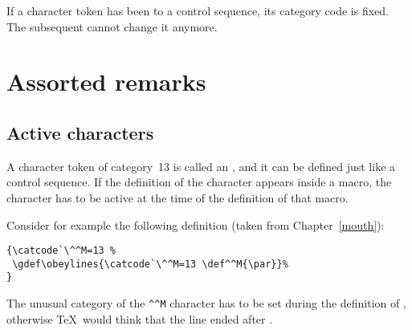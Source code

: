 \documentclass[letterpaper]{book}
\begin{document}
If a character token has been  to a control
sequence, its category code is fixed.
The subsequent  cannot change
it anymore.

\section{Assorted remarks}

\subsection{Active characters}

A character token of category~13 is called an
, and it
can be defined just like a control sequence.
If the definition of the character appears inside a macro,
the character has to be active at the time of the definition
of that macro.

Consider for example the following definition
(taken from Chapter~\ref{mouth}):
\begin{verbatim}
{\catcode`\^^M=13 %
 \gdef\obeylines{\catcode`\^^M=13 \def^^M{\par}}%
}
\end{verbatim}
The unusual category of the \verb>^^M> character
has to be set during the definition of ,
otherwise \TeX\ would think that the line ended
after .
\end{document}
